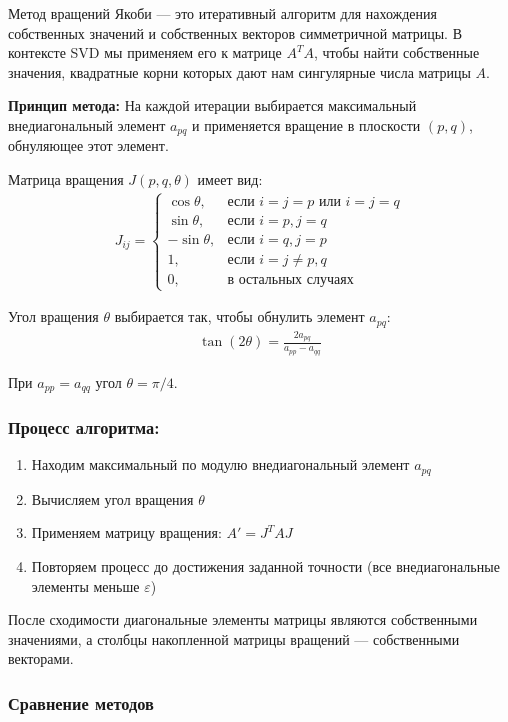 \documentclass[a4paper,12pt]{article}
\begin{document}
Метод вращений Якоби — это итеративный алгоритм для нахождения собственных значений и собственных векторов симметричной матрицы. В контексте SVD мы применяем его к матрице $A^TA$, чтобы найти собственные значения, квадратные корни которых дают нам сингулярные числа матрицы $A$.

\textbf{Принцип метода:} На каждой итерации выбирается максимальный внедиагональный элемент $a_{pq}$ и применяется вращение в плоскости $(p,q)$, обнуляющее этот элемент.

Матрица вращения $J(p,q,\theta)$ имеет вид:
\begin{align}
J_{ij} = 
\begin{cases}
\cos\theta, & \text{если } i=j=p \text{ или } i=j=q \\
\sin\theta, & \text{если } i=p, j=q \\
-\sin\theta, & \text{если } i=q, j=p \\
1, & \text{если } i=j \neq p,q \\
0, & \text{в остальных случаях}
\end{cases}
\end{align}

Угол вращения $\theta$ выбирается так, чтобы обнулить элемент $a_{pq}$:
\begin{align}
\tan(2\theta) = \frac{2a_{pq}}{a_{pp} - a_{qq}}
\end{align}

При $a_{pp} = a_{qq}$ угол $\theta = \pi/4$.

\subsubsection*{Процесс алгоритма:}
\begin{enumerate}
    \item Находим максимальный по модулю внедиагональный элемент $a_{pq}$
    \item Вычисляем угол вращения $\theta$
    \item Применяем матрицу вращения: $A' = J^T A J$
    \item Повторяем процесс до достижения заданной точности (все внедиагональные элементы меньше $\varepsilon$)
\end{enumerate}

После сходимости диагональные элементы матрицы являются собственными значениями, а столбцы накопленной матрицы вращений — собственными векторами.

\subsubsection{Сравнение методов}
\end{document}
